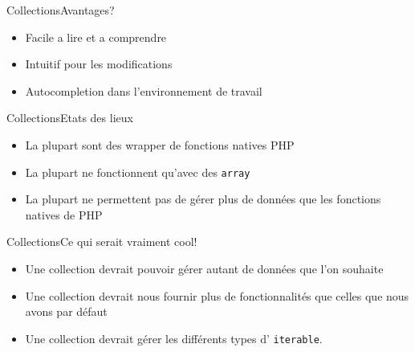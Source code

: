 \begin{frame}{Collections}{Avantages?}
    \begin{itemize}[<+->]
        \item Facile a lire et a comprendre
        \item Intuitif pour les modifications
        \item Autocompletion dans l'environnement de travail
    \end{itemize}
\end{frame}

\begin{frame}{Collections}{Etats des lieux}
    \begin{itemize}[<+->]
        \item La plupart sont des wrapper de fonctions natives PHP
        \item La plupart ne fonctionnent qu'avec des \texttt{array}
        \item La plupart ne permettent pas de gérer plus de données que les
        fonctions natives de PHP
    \end{itemize}
\end{frame}

\begin{frame}{Collections}{Ce qui serait vraiment cool!}
    \begin{itemize}[<+->]
        \item Une collection devrait pouvoir gérer autant de données que l'on
        souhaite
        \item Une collection devrait nous fournir plus de fonctionnalités que
        celles que nous avons par défaut
        \item Une collection devrait gérer les différents types d'
        \texttt{iterable}.
    \end{itemize}
\end{frame}
